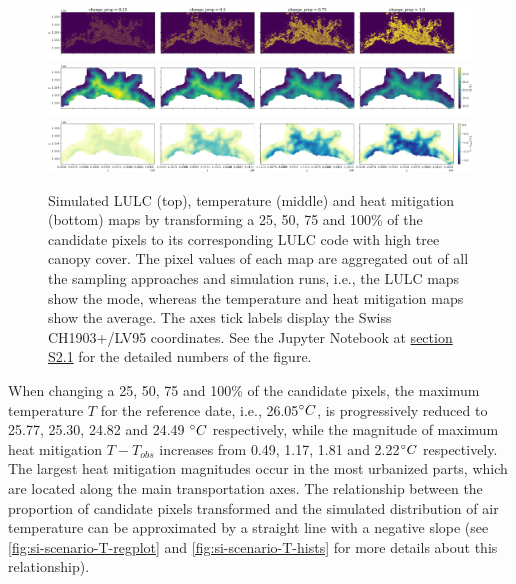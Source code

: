 \documentclass[10pt,letterpaper]{article}
\begin{document}
\begin{figure}
  \begin{adjustwidth}{-.4\textwidth}{0cm}
    \includegraphics[width=\linewidth]{figures/scenario-lulc-maps.png}
    \includegraphics[width=\linewidth]{figures/scenario-T-maps.png}
    \includegraphics[width=\linewidth]{figures/scenario-heat-mitigation-maps.png}
    \caption{\label{fig:scenario-maps} Simulated LULC (top), temperature (middle) and heat mitigation (bottom) maps by transforming a 25, 50, 75 and 100\% of the candidate pixels to its corresponding LULC code with high tree canopy cover. The pixel values of each map are aggregated out of all the sampling approaches and simulation runs, i.e., the LULC maps show the mode, whereas the temperature and heat mitigation maps show the average. The axes tick labels display the Swiss CH1903+/LV95 coordinates. See the Jupyter Notebook at \hyperref[sec:si-scenarios]{section S2.1} for the detailed numbers of the figure.}
  \end{adjustwidth}
\end{figure}
When changing a 25, 50, 75 and 100\% of the candidate pixels, the maximum temperature $T$ for the reference date, i.e., 26.05$\degree C$, is progressively reduced to 25.77, 25.30, 24.82 and 24.49 $\degree C$ respectively, while the magnitude of maximum heat mitigation $T - T_{obs}$ increases from 0.49, 1.17, 1.81 and 2.22$\degree C$ respectively.
The largest heat mitigation magnitudes occur in the most urbanized parts, which are located along the main transportation axes.
The relationship between the proportion of candidate pixels transformed and the simulated distribution of air temperature can be approximated by a straight line with a negative slope (see \autoref{fig:si-scenario-T-regplot} and \autoref{fig:si-scenario-T-hists} for more details about this relationship).
\end{document}
